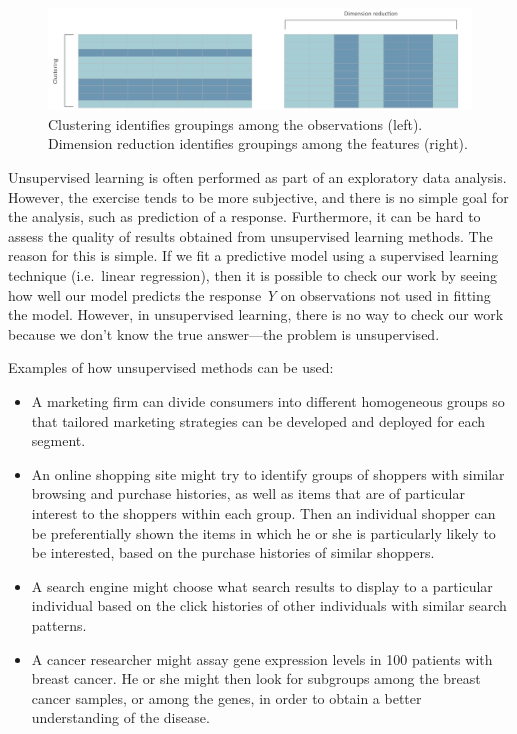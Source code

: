 \documentclass[]{book}
\providecommand{\tightlist}{%
  \setlength{\itemsep}{0pt}\setlength{\parskip}{0pt}}
\theoremstyle{definition}
\theoremstyle{definition}
\theoremstyle{definition}
\theoremstyle{remark}
\begin{document}
\begin{figure}

{\centering \includegraphics[width=0.7\linewidth]{illustrations/clustering_vs_pca} 

}

\caption{Clustering identifies groupings among the observations (left). Dimension reduction identifies groupings among the features (right).}\label{fig:cluster-pca}
\end{figure}

Unsupervised learning is often performed as part of an exploratory data
analysis. However, the exercise tends to be more subjective, and there
is no simple goal for the analysis, such as prediction of a response.
Furthermore, it can be hard to assess the quality of results obtained
from unsupervised learning methods. The reason for this is simple. If we
fit a predictive model using a supervised learning technique
(i.e.~linear regression), then it is possible to check our work by
seeing how well our model predicts the response \emph{Y} on observations
not used in fitting the model. However, in unsupervised learning, there
is no way to check our work because we don't know the true answer---the
problem is unsupervised.

\begin{tip}
Examples of how unsupervised methods can be used:

\begin{itemize}
\tightlist
\item
  A marketing firm can divide consumers into different homogeneous
  groups so that tailored marketing strategies can be developed and
  deployed for each segment.
\item
  An online shopping site might try to identify groups of shoppers with
  similar browsing and purchase histories, as well as items that are of
  particular interest to the shoppers within each group. Then an
  individual shopper can be preferentially shown the items in which he
  or she is particularly likely to be interested, based on the purchase
  histories of similar shoppers.
\item
  A search engine might choose what search results to display to a
  particular individual based on the click histories of other
  individuals with similar search patterns.
\item
  A cancer researcher might assay gene expression levels in 100 patients
  with breast cancer. He or she might then look for subgroups among the
  breast cancer samples, or among the genes, in order to obtain a better
  understanding of the disease.
\end{itemize}
\end{tip}
\end{document}

